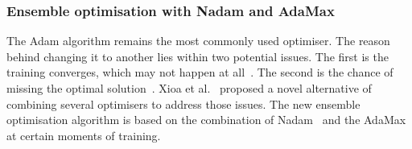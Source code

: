 \subsubsection{Ensemble optimisation with Nadam and AdaMax}
The Adam algorithm remains the most commonly used optimiser.
The reason behind changing it to another lies within two potential issues.
The first is the training converges, which may not happen at all~\cite{reddi_convergence_2019}.
The second is the chance of missing the optimal solution~\cite{wilson_marginal_2017}.
Xioa et al.~\cite{xiao_accurate_2019} proposed a novel alternative of combining several optimisers to address those issues.
The new ensemble optimisation algorithm is based on the combination of Nadam~\cite{dozat_nadam_2016} and the AdaMax~\cite{kingma_adam_2017} at certain moments of training.

